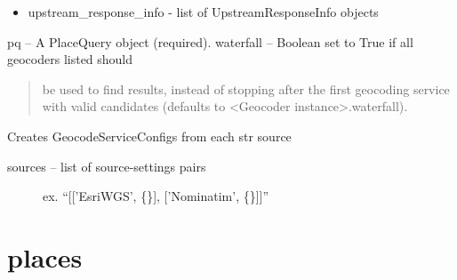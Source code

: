 \documentclass[letterpaper,10pt,english]{sphinxmanual}
\begin{document}
\begin{fulllineitems}
\begin{fulllineitems}
\begin{description}
\begin{itemize}
\item {} 
upstream\_response\_info - list of UpstreamResponseInfo objects

\end{itemize}

\end{description}

pq          --  A PlaceQuery object (required).
waterfall   --  Boolean set to True if all geocoders listed should
\begin{quote}

be used to find results, instead of stopping after
the first geocoding service with valid candidates
(defaults to \textless{}Geocoder instance\textgreater{}.waterfall).
\end{quote}

\end{fulllineitems}


\begin{fulllineitems}
\label{index:omgeo.Geocoder.set_sources}
Creates GeocodeServiceConfigs from each str source
\begin{description}
\item[{sources --  list of source-settings pairs}] \leavevmode
ex. ``{[}{[}'EsriWGS', \{\}{]}, {[}'Nominatim', \{\}{]}{]}''

\end{description}

\end{fulllineitems}


\end{fulllineitems}



\chapter{places}
\label{index:module-omgeo.places}\label{index:places}
\end{document}
